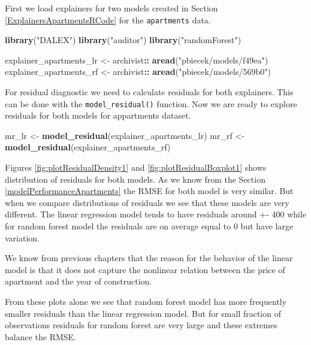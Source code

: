 \documentclass[12pt,]{krantz}
\newenvironment{Shaded}{\begin{snugshade}}{\end{snugshade}}
\newcommand{\KeywordTok}[1]{\textcolor[rgb]{0.13,0.29,0.53}{\textbf{#1}}}
\newcommand{\NormalTok}[1]{#1}
\newcommand{\OperatorTok}[1]{\textcolor[rgb]{0.81,0.36,0.00}{\textbf{#1}}}
\newcommand{\StringTok}[1]{\textcolor[rgb]{0.31,0.60,0.02}{#1}}
\begin{document}
First we load explainers for two models created in Section \ref{ExplainersApartmentsRCode} for the \texttt{apartments} data.

\begin{Shaded}
\begin{Highlighting}[]
\KeywordTok{library}\NormalTok{(}\StringTok{"DALEX"}\NormalTok{)}
\KeywordTok{library}\NormalTok{(}\StringTok{"auditor"}\NormalTok{)}
\KeywordTok{library}\NormalTok{(}\StringTok{"randomForest"}\NormalTok{)}

\NormalTok{explainer_apartments_lr <-}\StringTok{ }\NormalTok{archivist}\OperatorTok{::}\StringTok{ }\KeywordTok{aread}\NormalTok{(}\StringTok{"pbiecek/models/f49ea"}\NormalTok{)}
\NormalTok{explainer_apartments_rf <-}\StringTok{ }\NormalTok{archivist}\OperatorTok{::}\StringTok{ }\KeywordTok{aread}\NormalTok{(}\StringTok{"pbiecek/models/569b0"}\NormalTok{)}
\end{Highlighting}
\end{Shaded}

For residual diagnostic we need to calculate residuals for both explainers. This can be done with the \texttt{model\_residual()} function. Now we are ready to explore residuals for both models for appartments dataset.

\begin{Shaded}
\begin{Highlighting}[]
\NormalTok{mr_lr <-}\StringTok{ }\KeywordTok{model_residual}\NormalTok{(explainer_apartments_lr)}
\NormalTok{mr_rf <-}\StringTok{ }\KeywordTok{model_residual}\NormalTok{(explainer_apartments_rf)}
\end{Highlighting}
\end{Shaded}

Figures \ref{fig:plotResidualDensity1} and \ref{fig:plotResidualBoxplot1} shows distribution of residuals for both models. As we know from the Section \ref{modelPerformanceApartments} the RMSE for both model is very similar. But when we compare distributions of residuals we see that these models are very different. The linear regression model tends to have residuals around +- 400 while for random forest model the residuals are on average equal to 0 but have large variation.

We know from previous chapters that the reason for the behavior of the linear model is that it does not capture the nonlinear relation between the price of apartment and the year of construction.

From these plots alone we see that random forest model has more frequently smaller residuals than the linear regression model. But for small fraction of observations residuals for random forest are very large and these extremes balance the RMSE.
\end{document}
